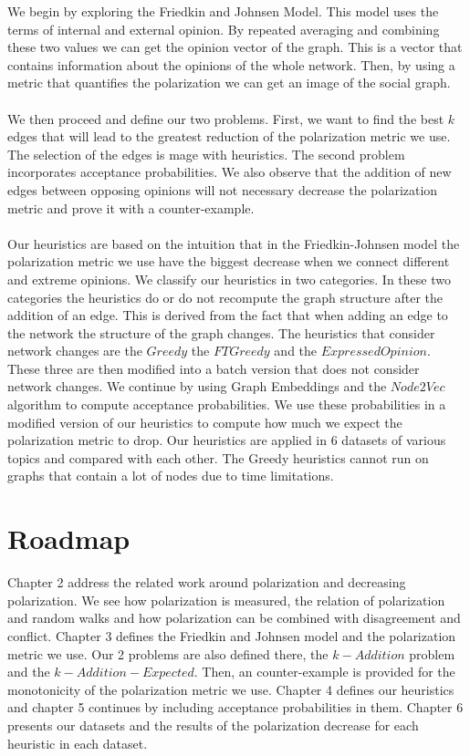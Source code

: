 We begin by exploring the Friedkin and Johnsen Model. This model uses the terms of internal and external opinion. By repeated averaging and combining these two values we can get the opinion vector of the graph.
This is a vector that contains information about the opinions of the whole network. Then, by using a metric that quantifies the polarization we can get an image of the social graph.
\\
\\
We then proceed and define our two problems. First, we want to find the best $k$ edges that will lead to the greatest reduction of the polarization metric we use. The selection of the edges is mage with heuristics. The second problem incorporates acceptance probabilities.
We also observe that the addition of new edges between opposing opinions will not necessary decrease the polarization metric and prove it with a counter-example.
\\
\\
Our heuristics are based on the intuition that in the Friedkin-Johnsen model the polarization metric we use have the biggest decrease when we connect different and extreme opinions. We classify our heuristics in two categories. In these two categories the heuristics do or do not recompute the graph structure after the addition of an edge. This is derived from the fact that when adding an edge to the network the structure of the graph changes. The heuristics that consider network changes are the $Greedy$ the $FTGreedy$ and the $Expressed Opinion$. These three are then modified into a batch version that does not consider network changes. We continue by using Graph Embeddings and the $Node2Vec$ algorithm to compute acceptance probabilities. We use these probabilities in a modified version of our heuristics to compute how much we expect the polarization metric to drop. Our heuristics are applied in 6 datasets of various topics and compared with each other. The Greedy heuristics cannot run on graphs that contain a lot of nodes due to time limitations.

\section{Roadmap}
\label{sec:roadmap}

Chapter 2 address the related work around polarization and decreasing polarization. We see how polarization is measured, the relation of polarization and random walks and how polarization can be combined with disagreement and conflict. Chapter 3 defines the Friedkin and Johnsen model and the polarization metric we use. Our 2 problems are also defined there, the $k-Addition$ problem and the $k-Addition-Expected$. Then, an counter-example is provided for the monotonicity of the polarization metric we use. Chapter 4 defines our heuristics and chapter 5 continues by including acceptance probabilities in them. Chapter 6 presents our datasets and the results of the polarization decrease for each heuristic in each dataset. 




